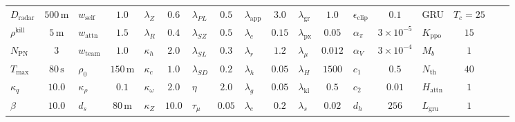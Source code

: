 \begin{table}[!htbp]
{\begin{tabular}{@{}lc|lc|lc|lc|lc|lc|lc|lc|lc@{}}
$D_{\mathrm{radar}}$  & $500\,\mathrm{m}$  & $w_{\mathrm{self}}$ & $1.0$             & $\lambda_Z$             & $0.6$           & $\lambda_{PL}$          & $0.5$           & $\lambda_{\mathrm{app}}$& $3.0$           & $\lambda_{\mathrm{gr}}$ & $1.0$              & $\epsilon_{\mathrm{clip}}$& $0.1$          & GRU                     & $T_c{=}25$         &                &   \\
$\rho^{\mathrm{kill}}$& $5\,\mathrm{m}$    & $w_{\mathrm{attn}}$ & $1.5$             & $\lambda_R$             & $0.4$           & $\lambda_{SZ}$          & $0.5$           & $\lambda_c$             & $0.15$          & $\lambda_{\mathrm{px}}$ & $0.05$             & $\alpha_{\pi}$           & $3{\times}10^{-5}$& $K_{\mathrm{ppo}}$     & $15$               &       &                \\
$N_{\mathrm{PN}}$     & $3$                & $w_{\mathrm{team}}$ & $1.0$             & $\kappa_h$              & $2.0$           & $\lambda_{SL}$          & $0.3$           & $\lambda_r$             & $1.2$           & $\lambda_{\mu}$         & $0.012$            & $\alpha_{V}$             & $3{\times}10^{-4}$& $M_b$                  & $1$                &                          &                  \\
$T_{\max}$            & $80\,\mathrm{s}$   & $\rho_0$            & $150\,\mathrm{m}$ & $\kappa_c$              & $1.0$           & $\lambda_{SD}$          & $0.2$           & $\lambda_h$             & $0.05$          & $\lambda_H$             & $1500$             & $c_1$                    & $0.5$           & $N_{\mathrm{th}}$       & $40$               &                          &                  \\
$\kappa_q$            & $10.0$             & $\kappa_{\rho}$     & $0.1$             & $\kappa_{\omega}$       & $2.0$           & $\eta$                  & $2.0$           & $\lambda_g$             & $0.05$          & $\lambda_{\mathrm{kl}}$ & $0.5$              & $c_2$                    & $0.01$          & $H_{\mathrm{attn}}$     & $1$              &                          &                  \\
$\beta$               & $10.0$             & $d_s$               & $80\,\mathrm{m}$ & $\kappa_Z$              & $10.0$          & $\tau_{\mu}$            & $0.05$          & $\lambda_e$             & $0.2$           & $\lambda_s$             & $0.02$             & $d_h$                    & $256$           & $L_{\mathrm{gru}}$      & $1$                &                          &                  \\
\bottomrule
\end{tabular}%
}
\end{table}



